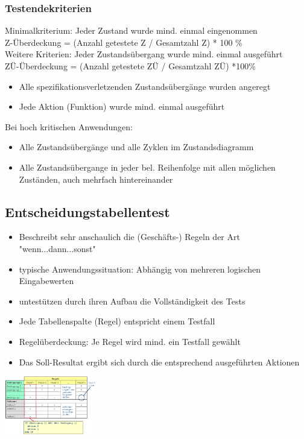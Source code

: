 \documentclass{report}
\newenvironment{Figure}
	{\par\medskip\noindent\minipage{\linewidth}}
	{\endminipage\par\medskip}
\theoremstyle{definition}
\theoremstyle{example}
\begin{document}
\subsubsection{Testendekriterien}
Minimalkriterium: Jeder Zustand wurde mind. einmal eingenommen\\
Z-Überdeckung = (Anzahl getestete Z / Gesamtzahl Z) * 100 \%\\

Weitere Kriterien: Jeder Zustandsübergang wurde mind. einmal ausgeführt\\
ZÜ-Überdeckung = (Anzahl getestete ZÜ / Gesamtzahl ZÜ) *100\%\\
\begin{itemize}
   \item Alle spezifikationsverletzenden Zustandsübergänge wurden angeregt
   \item Jede Aktion (Funktion) wurde mind. einmal ausgeführt
\end{itemize}

Bei hoch kritischen Anwendungen:
\begin{itemize}
   \item Alle Zustandsübergänge und alle Zyklen im Zustandsdiagramm
   \item Alle Zustandsübergange in jeder bel. Reihenfolge mit allen möglichen Zuständen, auch mehrfach hintereinander
\end{itemize}

\subsection{Entscheidungstabellentest}
\begin{itemize}
   \item Beschreibt sehr anschaulich die (Geschäfts-) Regeln der Art "wenn...dann...sonst"
   \item typische Anwendungssituation: Abhängig von mehreren logischen Eingabewerten
   \item untestützen durch ihren Aufbau die Vollständigkeit des Tests
   \item Jede Tabellenspalte (Regel) entspricht einem Testfall
   \item Regelüberdeckung: Je Regel wird mind. ein Testfall gewählt
   \item Das Soll-Resultat ergibt sich durch die entsprechend ausgeführten Aktionen
\end{itemize}

\begin{Figure}
   \centering
    \includegraphics[width=150px]{img/Entscheidungstabellentest.png}
        \label{fig:Abbildung eines Entscheidungstabellentest}
    \end{Figure}
\end{document}
